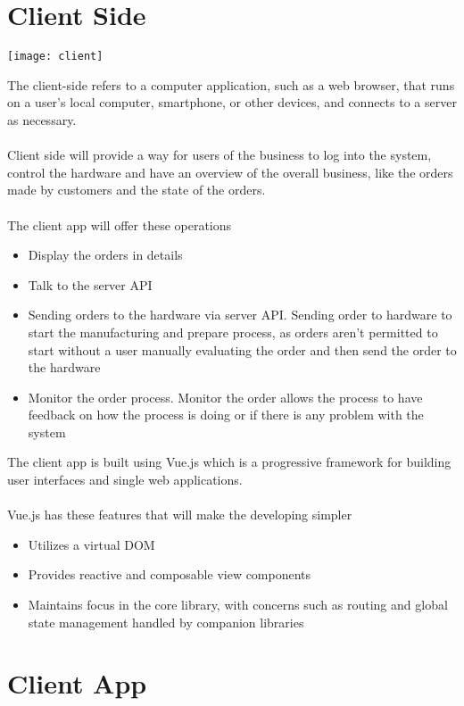 \section{Client Side}

\begin{center}
    \texttt{[image: client]}
\end{center}
The client-side refers to a computer application, such as a web browser, that runs on a user's local
computer, smartphone, or other devices, and connects to a server as necessary.\\\\
Client side will provide a way for users of the business to log into the system, control the hardware
and have an overview of the overall business, like the orders made by customers and the state of the
orders.\\\\
The client app will offer these operations
\begin{itemize}
    \item Display the orders in details
    \item Talk to the server API
    \item Sending orders to the hardware via server API. Sending order to hardware to start the
    manufacturing and prepare process, as orders aren’t permitted to start without a user manually
    evaluating the order and then send the order to the hardware
    \item Monitor the order process. Monitor the order allows the process to have feedback on how the
    process is doing or if there is any problem with the system
\end{itemize}

The client app is built using Vue.js which is a progressive framework for building user interfaces and
single web applications.\\\\
Vue.js has these features that will make the developing simpler
\begin{itemize}
    \item Utilizes a virtual DOM
    \item Provides reactive and composable view components
    \item Maintains focus in the core library, with concerns such as routing and global state
    management handled by companion libraries
\end{itemize}


\section{Client App}

